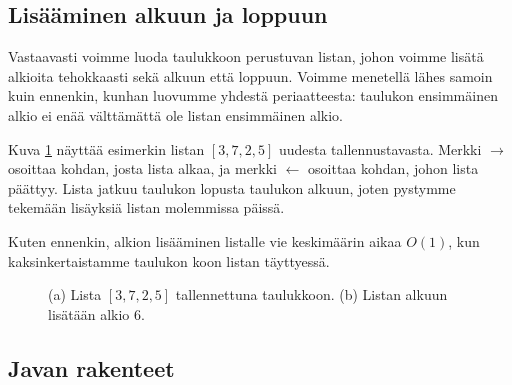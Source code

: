\subsection{Lisääminen alkuun ja loppuun}

Vastaavasti voimme luoda taulukkoon perustuvan listan,
johon voimme lisätä alkioita tehokkaasti sekä alkuun että loppuun.
Voimme menetellä lähes samoin kuin ennenkin,
kunhan luovumme yhdestä periaatteesta:
taulukon ensimmäinen alkio ei enää välttämättä
ole listan ensimmäinen alkio.

Kuva \ref{fig:lismol} näyttää esimerkin listan $[3,7,2,5]$
uudesta tallennustavasta.
Merkki $\rightarrow$ osoittaa kohdan, josta lista alkaa,
ja merkki $\leftarrow$ osoittaa kohdan, johon lista päättyy.
Lista jatkuu taulukon lopusta taulukon alkuun, joten pystymme
tekemään lisäyksiä listan molemmissa päissä.

Kuten ennenkin, alkion lisääminen listalle vie keskimäärin
aikaa $O(1)$, kun kaksinkertaistamme taulukon koon listan täyttyessä.

\begin{figure}
\center
{}
\caption{(a) Lista $[3,7,2,5]$ tallennettuna taulukkoon. (b) Listan alkuun lisätään alkio 6.}
\label{fig:lismol}
\end{figure}


\subsection{Javan rakenteet}

